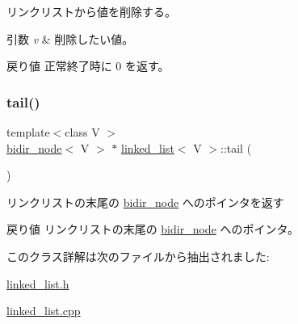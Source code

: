 リンクリストから値を削除する。 
\begin{DoxyParams}{引数}
{\em v} & 削除したい値。 \\
\hline
\end{DoxyParams}
\begin{DoxyReturn}{戻り値}
正常終了時に 0 を返す。 
\end{DoxyReturn}
\hypertarget{classlinked__list_aefd6410f20630d227f0d4d4ed895d15b}{}\label{classlinked__list_aefd6410f20630d227f0d4d4ed895d15b} 
\subsubsection{\texorpdfstring{tail()}{tail()}}
{\footnotesize\ttfamily template$<$class V $>$ \\
\hyperlink{classbidir__node}{bidir\+\_\+node}$<$ V $>$ $\ast$ \hyperlink{classlinked__list}{linked\+\_\+list}$<$ V $>$\+::tail (\begin{DoxyParamCaption}{ }\end{DoxyParamCaption})}

リンクリストの末尾の \hyperlink{classbidir__node}{bidir\+\_\+node} へのポインタを返す \begin{DoxyReturn}{戻り値}
リンクリストの末尾の \hyperlink{classbidir__node}{bidir\+\_\+node} へのポインタ。 
\end{DoxyReturn}


このクラス詳解は次のファイルから抽出されました\+:\begin{DoxyCompactItemize}
\item 
\hyperlink{linked__list_8h}{linked\+\_\+list.\+h}\item 
\hyperlink{linked__list_8cpp}{linked\+\_\+list.\+cpp}\end{DoxyCompactItemize}
